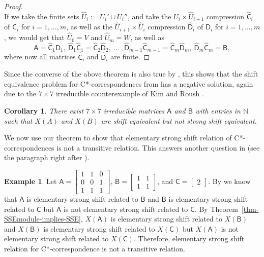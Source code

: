 \documentclass[11pt, letterpaper,final]{amsart}
\newtheorem{cor}[thm]{Corollary}
\theoremstyle{definition}
\newtheorem{exm}[thm]{Example}
\begin{document}
\begin{proof}
$$$$
If we take the finite sets $\widehat{U}_i:= U_i' \cup U_i''$, and take the $\widehat{U}_i \times \widehat{U}_{i+1}$ compression $\widehat{\mathsf{C}}_i$ of $\mathsf{C}_i$ for $i=1,...,m$, as well as the  $\widehat{U}_{i+1} \times \widehat{U}_i$ compression $\widehat{\mathsf{D}}_i$ of $\mathsf{D}_i$ for $i=1,...,m$, we would get that $\widehat{U}_0 = V$ and $\widehat{U}_m=W$, as well as
$$
\mathsf{A} = \widehat{\mathsf{C}}_1\widehat{\mathsf{D}}_1, \ \widehat{\mathsf{D}}_1\widehat{\mathsf{C}}_1 = \widehat{\mathsf{C}}_2\widehat{\mathsf{D}}_2, \ ... \ , \widehat{\mathsf{D}}_{m-1}\widehat{\mathsf{C}}_{m-1} = \widehat{\mathsf{C}}_m\widehat{\mathsf{D}}_m, \ \widehat{\mathsf{D}}_m\widehat{\mathsf{C}}_m = \mathsf{B},
$$
where now all matrices $\widehat{\mathsf{C}}_i$ and $\widehat{\mathsf{D}}_i$ are finite.
\end{proof}

Since the converse of the above theorem is also true by \cite[Proposition 3.3]{CDE}, this shows that the shift equivalence problem for C*-correspondences from \cite[Section 6]{KK-JFA2014} has a negative solution, again due to the $7 \times 7$ irreducible counterexample of Kim and Roush \cite{KR99}.

\begin{cor} \label{cor:sep-neg}
There exist $7\times 7$ irreducible matrices $\mathsf{A}$ and $\mathsf{B}$ with entries in $\mathbb{N}$ such that $X(A)$ and $X(B)$ are shift equivalent but not strong shift equivalent.
\end{cor}

We now use our theorem to show that elementary strong shift relation of C*-correspondences is not a transitive relation. This answers another question in \cite{KK-JFA2014} (see the paragraph right after \cite[Definition 4.3]{KK-JFA2014}).  

\begin{exm}
Let $\mathsf{A} = \begin{bmatrix} 1 & 1 & 0 \\ 0 & 0 & 1 \\ 1 & 1 & 1 \end{bmatrix}$, $\mathsf{B} = \begin{bmatrix} 1& 1 \\ 1 & 1 \end{bmatrix}$, and $\mathsf{C} = \begin{bmatrix} 2 \end{bmatrix}$. By \cite[Example 7.2.2]{LM95} we know that $\mathsf{A}$ is elementary strong shift related to $\mathsf{B}$ and $\mathsf{B}$ is elementary strong shift related to $\mathsf{C}$ but $\mathsf{A}$ is not elementary strong shift related to $\mathsf{C}$. By Theorem~\ref{thm-SSEmodule-implies-SSE}, $X(\mathsf{A})$ is elementary strong shift related to $X(\mathsf{B})$ and $X(\mathsf{B})$ is elementary strong shift related to $X(\mathsf{C})$ but $X(\mathsf{A})$ is not elementary strong shift related to $X(\mathsf{C})$.  Therefore, elementary strong shift relation for C*-correspondence is not a transitive relation.  
\end{exm}
\end{document}
